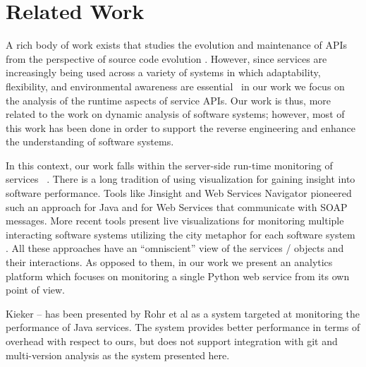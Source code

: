 
\section{Related Work}
\label{sec:related}



A rich body of work exists that studies the evolution and maintenance of APIs from the perspective of source code evolution \cite{dig2006apis, hora2015developers, hora2015apiwave}. However, since services are increasingly being used across a variety of systems in which adaptability, flexibility, and environmental awareness are essential~\cite{pernici2016monitoring} in our work we focus on the analysis of the runtime aspects of service APIs. Our work is thus, more related to the work on dynamic analysis of software systems; however, most of this work has been done in order to support the reverse engineering and enhance the understanding of software systems\cite{Corn09-dynamic}. 

In this context, our work falls within the server-side run-time monitoring of services ~\cite{ghezzi2007run}. 
There is a long tradition of using visualization for gaining insight into software performance. Tools like Jinsight \cite{Pauw02a} and Web Services Navigator \cite{Pauw05} pioneered such an approach for Java and for Web Services that communicate with SOAP messages. More recent tools present live visualizations for monitoring multiple interacting software systems utilizing the city metaphor for each software system \cite{fittkau2013live}. All these approaches have an ``omniscient'' view of the services / objects and their interactions. As opposed to them, in our work we present an analytics platform which focuses on monitoring a single Python web service from its own point of view. 

Kieker -- has been presented by Rohr et al \cite{Rohr08} as a system targeted at monitoring the performance of Java services. The system provides better performance in terms of overhead with respect to ours, but does not support integration with git and multi-version analysis as the system presented here. 

